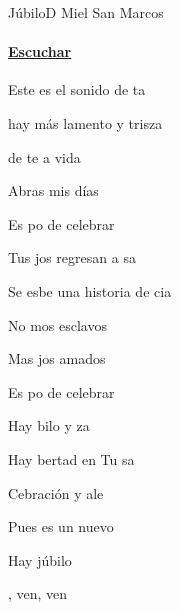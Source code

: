 \documentclass[12pt, spanish]{book}
\begin{document}
    \begin{song}{Júbilo}{D}
    {} %
    {Miel San Marcos}
    {} %
    {}
        \ifChordBk
        \paragraph{\mbox{}\hfill\protect\href{https://open.spotify.com/intl-es/track/7d8neMf5jV8EQNUrIyji7H}{Escuchar}\mbox{}\hfill}
        \fi



        \begin{SBOpGroup}
            Este es el sonido de ta

             hay más lamento y trisza

            de te a vida

            Abras mis días

            Es po de celebrar
        \end{SBOpGroup}

        \begin{SBOpGroup}
            Tus jos regresan a sa

            Se esbe una historia de cia

            No mos esclavos

            Mas jos amados

            Es po de celebrar
        \end{SBOpGroup}

        \begin{SBChorus}
            Hay bilo y za

            Hay bertad en Tu sa

            Cebración y ale

            Pues  es un nuevo 

            Hay júbilo
        \end{SBChorus}


        \begin{SBOpGroup}
            , ven, ven


\end{SBOpGroup}
\end{song}
\end{document}
